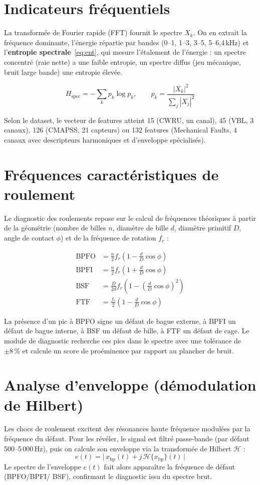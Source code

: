 \section{Indicateurs fréquentiels}
La transformée de Fourier rapide (FFT) fournit le spectre $X_k$. On en extrait la fréquence
dominante, l'énergie répartie par bandes (0--1, 1--3, 3--5, 5--6{,}4\,kHz) et
l'\textbf{entropie spectrale}~\eqref{eq:ent}, qui mesure l'étalement de l'énergie : un
spectre concentré (raie nette) a une faible entropie, un spectre diffus (jeu mécanique,
bruit large bande) une entropie élevée.

\begin{equation}
H_{\text{spec}} = -\sum_k p_k \log p_k, \qquad p_k = \frac{|X_k|^2}{\sum_j |X_j|^2}
\label{eq:ent}
\end{equation}

Selon le dataset, le vecteur de features atteint 15 (CWRU, un canal), 45 (VBL, 3 canaux),
126 (CMAPSS, 21 capteurs) ou 132 features (Mechanical Faults, 4 canaux avec descripteurs
harmoniques et d'enveloppe spécialisés).

\section{Fréquences caractéristiques de roulement}
Le diagnostic des roulements repose sur le calcul de fréquences théoriques à partir de la
géométrie (nombre de billes $n$, diamètre de bille $d$, diamètre primitif $D$, angle de
contact $\phi$) et de la fréquence de rotation $f_r$ :

\begin{align}
\text{BPFO} &= \tfrac{n}{2} f_r \left(1 - \tfrac{d}{D}\cos\phi\right) \\
\text{BPFI} &= \tfrac{n}{2} f_r \left(1 + \tfrac{d}{D}\cos\phi\right) \\
\text{BSF}  &= \tfrac{D}{2d} f_r \left(1 - \left(\tfrac{d}{D}\cos\phi\right)^2\right) \\
\text{FTF}  &= \tfrac{f_r}{2} \left(1 - \tfrac{d}{D}\cos\phi\right)
\end{align}

La présence d'un pic à BPFO signe un défaut de bague externe, à BPFI un défaut de bague
interne, à BSF un défaut de bille, à FTF un défaut de cage. Le module de diagnostic recherche
ces pics dans le spectre avec une tolérance de $\pm 8\,\%$ et calcule un score de proéminence
par rapport au plancher de bruit.

\section{Analyse d'enveloppe (démodulation de Hilbert)}
Les chocs de roulement excitent des résonances haute fréquence modulées par la fréquence du
défaut. Pour les révéler, le signal est filtré passe-bande (par défaut 500--5\,000\,Hz),
puis on calcule son enveloppe via la transformée de Hilbert $\mathcal{H}$ :
\begin{equation}
e(t) = \big|\, x_{\text{bp}}(t) + j\,\mathcal{H}\{x_{\text{bp}}\}(t)\,\big|
\end{equation}
Le spectre de l'enveloppe $e(t)$ fait alors apparaître la fréquence de défaut (BPFO/BPFI/
BSF), confirmant le diagnostic issu du spectre brut.

